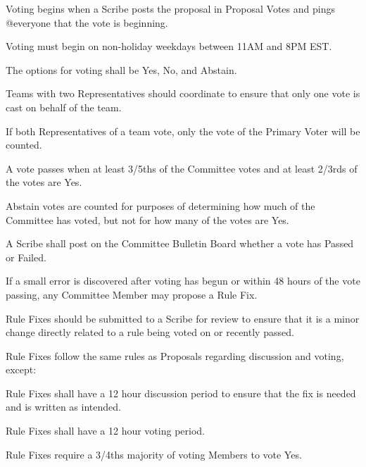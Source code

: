 \begin{deepEnumerate}
    \item Voting begins when a Scribe posts the proposal in Proposal Votes and pings @everyone that the vote is beginning.
    \item Voting must begin on non-holiday weekdays between 11AM and 8PM EST.
    \item The options for voting shall be Yes, No, and Abstain.
    \item Teams with two Representatives should coordinate to ensure that only one vote is cast on behalf of the team.
    \begin{deepEnumerate}
        \item If both Representatives of a team vote, only the vote of the Primary Voter will be counted.
    \end{deepEnumerate}
    \item A vote passes when at least 3/5ths of the Committee votes and at least 2/3rds of the votes are Yes.
    \begin{deepEnumerate}
        \item Abstain votes are counted for purposes of determining how much of the Committee has voted, but not for how many of the votes are Yes.
    \end{deepEnumerate}
    \item A Scribe shall post on the Committee Bulletin Board whether a vote has Passed or Failed.
\end{deepEnumerate}

\begin{deepEnumerate}
    \item If a small error is discovered after voting has begun or within 48 hours of the vote passing, any Committee Member may propose a Rule Fix.
    \item Rule Fixes should be submitted to a Scribe for review to ensure that it is a minor change directly related to a rule being voted on or recently passed.
    \item Rule Fixes follow the same rules as Proposals regarding discussion and voting, except:
    \begin{deepEnumerate}
        \item Rule Fixes shall have a 12 hour discussion period to ensure that the fix is needed and is written as intended.
        \item Rule Fixes shall have a 12 hour voting period.
        \item Rule Fixes require a 3/4ths majority of voting Members to vote Yes.
    \end{deepEnumerate}
\end{deepEnumerate}

